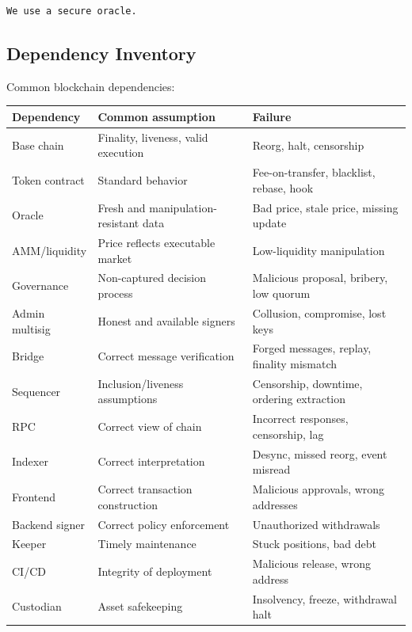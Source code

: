 \begin{lstlisting}
We use a secure oracle.
\end{lstlisting}

\subsection{Dependency Inventory}

Common blockchain dependencies:

{\def\LTcaptype{none} %
\begin{longtable}[]{@{}
  >{\raggedright\arraybackslash}p{}
  >{\raggedright\arraybackslash}p{}
  >{\raggedright\arraybackslash}p{}@{}}
\toprule\noalign{}
\begin{minipage}[b]{\linewidth}\raggedright
Dependency
\end{minipage} & \begin{minipage}[b]{\linewidth}\raggedright
Common assumption
\end{minipage} & \begin{minipage}[b]{\linewidth}\raggedright
Failure
\end{minipage} \\
\midrule\noalign{}
\endhead
\bottomrule\noalign{}
\endlastfoot
Base chain & Finality, liveness, valid execution & Reorg, halt,
censorship \\
Token contract & Standard behavior & Fee-on-transfer, blacklist, rebase,
hook \\
Oracle & Fresh and manipulation-resistant data & Bad price, stale price,
missing update \\
AMM/liquidity & Price reflects executable market & Low-liquidity
manipulation \\
Governance & Non-captured decision process & Malicious proposal,
bribery, low quorum \\
Admin multisig & Honest and available signers & Collusion, compromise,
lost keys \\
Bridge & Correct message verification & Forged messages, replay,
finality mismatch \\
Sequencer & Inclusion/liveness assumptions & Censorship, downtime,
ordering extraction \\
RPC & Correct view of chain & Incorrect responses, censorship, lag \\
Indexer & Correct interpretation & Desync, missed reorg, event
misread \\
Frontend & Correct transaction construction & Malicious approvals, wrong
addresses \\
Backend signer & Correct policy enforcement & Unauthorized
withdrawals \\
Keeper & Timely maintenance & Stuck positions, bad debt \\
CI/CD & Integrity of deployment & Malicious release, wrong address \\
Custodian & Asset safekeeping & Insolvency, freeze, withdrawal halt \\
\end{longtable}
}

